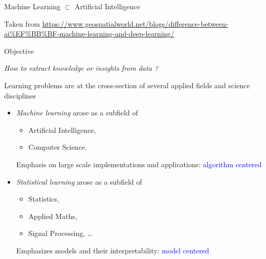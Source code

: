 \documentclass[pressentation,9pt,aspectratio=1610,xcolor=table]{beamer}
\begin{document}
\begin{frame}[fragile]{Machine Learning $\subset$ Artificial Intelligence}
  \begin{center}
  \end{center}
  {\tiny Taken from \url{https://www.geospatialworld.net/blogs/difference-between-ai%EF%BB%BF-machine-learning-and-deep-learning/}}
\end{frame}

\begin{frame}{Objective}
  \begin{center}
    \emph{How to extract knowledge or insights from data ?}
  \end{center}
  Learning problems are at the cross-section of several applied fields and science disciplines
  \begin{itemize}
  \item \emph{Machine learning} arose as a subfield of
    \begin{itemize}
    \item Artificial Intelligence,
    \item Computer Science.
    \end{itemize}
    Emphasis on large scale implementations and applications: \textcolor{blue}{algorithm centered}
  \item  \emph{Statistical learning} arose as a subfield of
    \begin{itemize}
    \item Statistics,
    \item Applied Maths,
    \item Signal Processing, \ldots
    \end{itemize}
    Emphasizes models and their interpretability: \textcolor{blue}{model centered}
  \end{itemize}
\end{frame}
\end{document}

